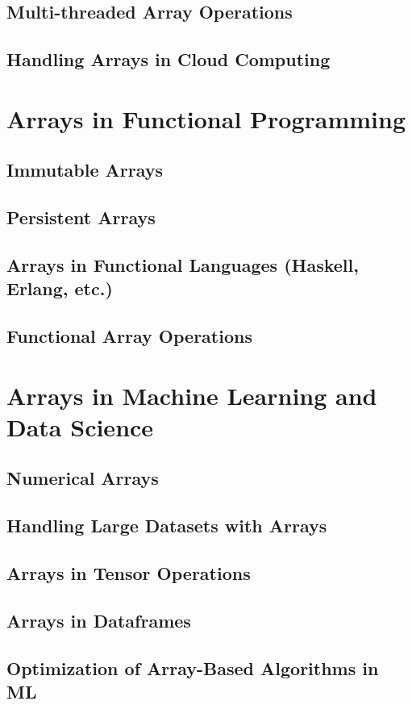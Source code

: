 \documentclass[12pt, oneside]{book}
\begin{document}
\section{Multi-threaded Array Operations}
\section{Handling Arrays in Cloud Computing}

\chapter{Arrays in Functional Programming}
\section{Immutable Arrays}
\section{Persistent Arrays}
\section{Arrays in Functional Languages (Haskell, Erlang, etc.)}
\section{Functional Array Operations}
	
\chapter{Arrays in Machine Learning and Data Science}
\section{Numerical Arrays}
\section{Handling Large Datasets with Arrays}
\section{Arrays in Tensor Operations}
\section{Arrays in Dataframes}
\section{Optimization of Array-Based Algorithms in ML}
\end{document}
